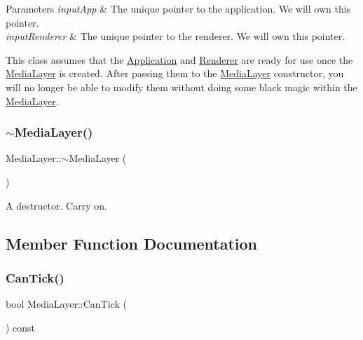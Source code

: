 \begin{DoxyParams}{Parameters}
{\em input\+App} & The unique pointer to the application. We will own this pointer. \\
\hline
{\em input\+Renderer} & The unique pointer to the renderer. We will own this pointer.\\
\hline
\end{DoxyParams}
This class assumes that the \hyperlink{class_application}{Application} and \hyperlink{class_renderer}{Renderer} are ready for use once the \hyperlink{class_media_layer}{Media\+Layer} is created. After passing them to the \hyperlink{class_media_layer}{Media\+Layer} constructor, you will no longer be able to modify them without doing some black magic within the \hyperlink{class_media_layer}{Media\+Layer}. \hypertarget{class_media_layer_a0c64e2d0a1c7b34b5457a0c57b69bbb1}{}\label{class_media_layer_a0c64e2d0a1c7b34b5457a0c57b69bbb1}
\subsubsection{\texorpdfstring{$\sim$\+Media\+Layer()}{~MediaLayer()}}
{\footnotesize\ttfamily Media\+Layer\+::$\sim$\+Media\+Layer (\begin{DoxyParamCaption}{ }\end{DoxyParamCaption})}



A destructor. Carry on.



\subsection{Member Function Documentation}
\hypertarget{class_media_layer_a023b4033ca8a44d25c6e37a0ff4178e8}{}\label{class_media_layer_a023b4033ca8a44d25c6e37a0ff4178e8}
\subsubsection{\texorpdfstring{Can\+Tick()}{CanTick()}}
{\footnotesize\ttfamily bool Media\+Layer\+::\+Can\+Tick (\begin{DoxyParamCaption}{ }\end{DoxyParamCaption}) const}



